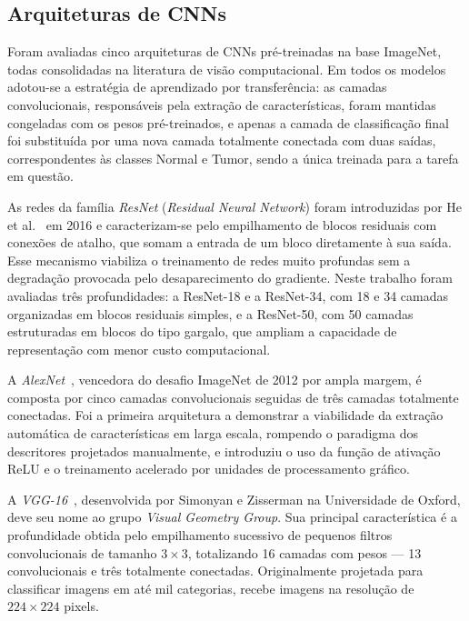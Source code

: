 \documentclass[conference]{IEEEtran}
\begin{document}
\subsection{Arquiteturas de CNNs}

Foram avaliadas cinco arquiteturas de CNNs pré-treinadas na base ImageNet,
todas consolidadas na literatura de visão computacional. Em todos os modelos
adotou-se a estratégia de aprendizado por transferência: as camadas
convolucionais, responsáveis pela extração de características, foram mantidas
congeladas com os pesos pré-treinados, e apenas a camada de classificação
final foi substituída por uma nova camada totalmente conectada com duas
saídas, correspondentes às classes Normal e Tumor, sendo a única treinada
para a tarefa em questão.

As redes da família \textit{ResNet} (\textit{Residual Neural Network}) foram
introduzidas por He et al.~\cite{he2016} em 2016 e caracterizam-se pelo
empilhamento de blocos residuais com conexões de atalho, que somam a entrada
de um bloco diretamente à sua saída. Esse mecanismo viabiliza o treinamento
de redes muito profundas sem a degradação provocada pelo desaparecimento do
gradiente. Neste trabalho foram avaliadas três profundidades: a ResNet-18 e a
ResNet-34, com 18 e 34 camadas organizadas em blocos residuais simples, e a
ResNet-50, com 50 camadas estruturadas em blocos do tipo gargalo, que ampliam
a capacidade de representação com menor custo computacional.

A \textit{AlexNet}~\cite{krizhevsky2012}, vencedora do desafio ImageNet de
2012 por ampla margem, é composta por cinco camadas convolucionais seguidas
de três camadas totalmente conectadas. Foi a primeira arquitetura a
demonstrar a viabilidade da extração automática de características em larga
escala, rompendo o paradigma dos descritores projetados manualmente, e
introduziu o uso da função de ativação ReLU e o treinamento acelerado por
unidades de processamento gráfico.

A \textit{VGG-16}~\cite{simonyan2014}, desenvolvida por Simonyan e Zisserman
na Universidade de Oxford, deve seu nome ao grupo \textit{Visual Geometry
Group}. Sua principal característica é a profundidade obtida pelo
empilhamento sucessivo de pequenos filtros convolucionais de tamanho
$3{\times}3$, totalizando 16 camadas com pesos — 13 convolucionais e
três totalmente conectadas. Originalmente projetada para classificar imagens em
até mil categorias, recebe imagens na resolução de $224{\times}224$ pixels.
\end{document}
